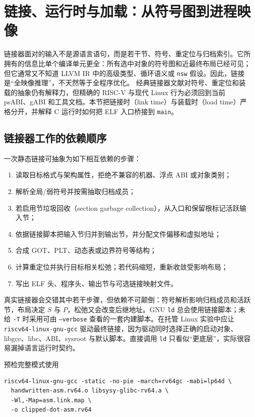 \section{链接、运行时与加载：从符号图到进程映像}
\label{sec:linker-loader}

链接器面对的输入不是源语言语句，而是若干节、符号、重定位与归档索引。它所拥有的信息比单个编译单元更全：所有选中对象的符号图和近最终布局已经可见；但它通常又不知道 LLVM IR 中的高级类型、循环语义或 \texttt{nsw} 假设。因此，链接是“全映像推理”，不天然等于全程序优化。 经典链接器文献对符号、重定位和装载的抽象仍有解释力\cite{bin-levine-linkers}，但精确的 RISC-V 与现代 Linux 行为必须回到当前 psABI、gABI 和工具文档。本节把链接时（link time）与装载时（load time）严格分开，并解释 C 运行时如何把 ELF 入口桥接到 \texttt{main}。

\subsection{链接器工作的依赖顺序}

一次静态链接可抽象为如下相互依赖的步骤：

\begin{enumerate}
  \item 读取目标格式与架构属性，拒绝不兼容的机器、浮点 ABI 或对象类别；
  \item 解析全局/弱符号并按需抽取归档成员；
  \item 若启用节垃圾回收（section garbage collection），从入口和保留根标记活跃输入节；
  \item 依据链接脚本把输入节归并到输出节，并分配文件偏移和虚拟地址；
  \item 合成 GOT、PLT、动态表或边界符号等结构；
  \item 计算重定位并执行目标相关松弛；若代码缩短，重新收敛受影响布局；
  \item 写出 ELF 头、程序头、输出节与可选链接映射文件。
\end{enumerate}

真实链接器会交错其中若干步骤，但依赖不可颠倒：符号解析影响归档成员和活跃节，布局决定 \(S\) 与 \(P\)，松弛又会改变后继地址。GNU \texttt{ld} 总会使用链接脚本；未给 \texttt{-T} 时采用可由 \texttt{--verbose} 查看的一套内建脚本\cite{bin-gnu-ld-scripts}。在托管 Linux 实验中应让 \texttt{riscv64-linux-gnu-gcc} 驱动最终链接，因为驱动同时选择正确的启动对象、libgcc、libc、ABI、sysroot 与默认脚本。直接调用 \texttt{ld} 只看似“更底层”，实际很容易漏掉语言运行时契约。

预检完整模式使用

\begin{verbatim}
riscv64-linux-gnu-gcc -static -no-pie -march=rv64gc -mabi=lp64d \
  handwritten-asm.rv64.o libsysy-glibc-rv64.a \
  -Wl,-Map=asm.link.map \
  -o clipped-dot-asm.rv64
\end{verbatim}


